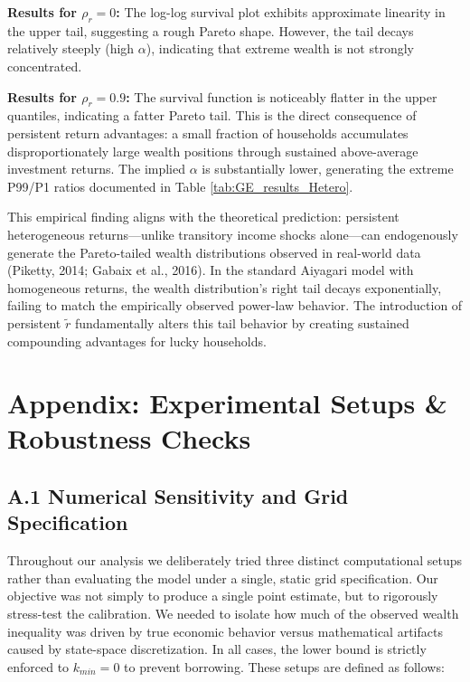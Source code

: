 \documentclass[11pt, a4paper]{article}
\begin{document}
\textbf{Results for $\rho_r = 0$:} The log-log survival plot exhibits approximate linearity in the upper tail, suggesting a rough Pareto shape. However, the tail decays relatively steeply (high $\alpha$), indicating that extreme wealth is not strongly concentrated.

\textbf{Results for $\rho_r = 0.9$:} The survival function is noticeably flatter in the upper quantiles, indicating a fatter Pareto tail. This is the direct consequence of persistent return advantages: a small fraction of households accumulates disproportionately large wealth positions through sustained above-average investment returns. The implied $\alpha$ is substantially lower, generating the extreme P99/P1 ratios documented in Table \ref{tab:GE_results_Hetero}.

This empirical finding aligns with the theoretical prediction: persistent heterogeneous returns---unlike transitory income shocks alone---can endogenously generate the Pareto-tailed wealth distributions observed in real-world data (Piketty, 2014; Gabaix et al., 2016). In the standard Aiyagari model with homogeneous returns, the wealth distribution's right tail decays exponentially, failing to match the empirically observed power-law behavior. The introduction of persistent $\tilde{r}$ fundamentally alters this tail behavior by creating sustained compounding advantages for lucky households.

\newpage

\section*{Appendix: Experimental Setups \& Robustness Checks}

\subsection*{A.1 Numerical Sensitivity and Grid Specification}

Throughout our analysis we deliberately tried three distinct computational setups rather than evaluating the model under a single, static grid specification. Our objective was not simply to produce a single point estimate, but to rigorously stress-test the calibration. We needed to isolate how much of the observed wealth inequality was driven by true economic behavior versus mathematical artifacts caused by state-space discretization. In all cases, the lower bound is strictly enforced to $k_{min}=0$ to prevent borrowing. These setups are defined as follows:
\end{document}
